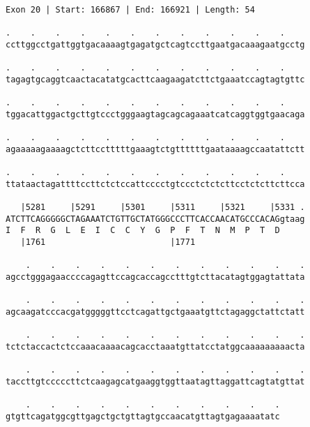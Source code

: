 \documentclass{article}
\begin{document}
\begin{Verbatim}
Exon 20 | Start: 166867 | End: 166921 | Length: 54
 
.    .    .    .    .    .    .    .    .    .    .    .    
ccttggcctgattggtgacaaaagtgagatgctcagtccttgaatgacaaagaatgcctg
  
.    .    .    .    .    .    .    .    .    .    .    .    
tagagtgcaggtcaactacatatgcacttcaagaagatcttctgaaatccagtagtgttc
  
.    .    .    .    .    .    .    .    .    .    .    .    
tggacattggactgcttgtccctgggaagtagcagcagaaatcatcaggtggtgaacaga
  
.    .    .    .    .    .    .    .    .    .    .    .    
agaaaaagaaaagctcttcctttttgaaagtctgttttttgaataaaagccaatattctt
  
.    .    .    .    .    .    .    .    .    .    .    .    
ttataactagattttccttctctccattcccctgtccctctctcttcctctcttcttcca
  
   |5281     |5291     |5301     |5311     |5321     |5331 .
ATCTTCAGGGGGCTAGAAATCTGTTGCTATGGGCCCTTCACCAACATGCCCACAGgtaag
I  F  R  G  L  E  I  C  C  Y  G  P  F  T  N  M  P  T  D     
   |1761                         |1771                      
  
    .    .    .    .    .    .    .    .    .    .    .    .
agcctgggagaaccccagagttccagcaccagcctttgtcttacatagtggagtattata
  
    .    .    .    .    .    .    .    .    .    .    .    .
agcaagatcccacgatgggggttcctcagattgctgaaatgttctagaggctattctatt
  
    .    .    .    .    .    .    .    .    .    .    .    .
tctctaccactctccaaacaaaacagcacctaaatgttatcctatggcaaaaaaaaacta
  
    .    .    .    .    .    .    .    .    .    .    .    .
taccttgtcccccttctcaagagcatgaaggtggttaatagttaggattcagtatgttat
  
    .    .    .    .    .    .    .    .    .    .    .
gtgttcagatggcgttgagctgctgttagtgccaacatgttagtgagaaaatatc
\end{Verbatim}
\newpage
\end{document}
